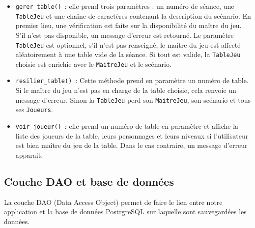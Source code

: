 \documentclass[11pt]{article}
\begin{document}
\begin{itemize}[label=, font=\small]
    \item \texttt{gerer\_table()}~: elle prend trois paramètres : un numéro de séance, une \texttt{TableJeu} et une chaîne de caractères contenant la description du scénario. En premier lieu, une vérification est faite sur la disponibilité du maître du jeu. S'il n'est pas disponible, un message d'erreur est retourné. Le paramètre \texttt{TableJeu} est optionnel, s'il n'est pas renseigné, le maître du jeu est affecté aléatoirement à une table vide de la séance. Si tout est valide, la \texttt{TableJeu} choisie est enrichie avec le \texttt{MaitreJeu} et le scénario.
    
    \item \texttt{resilier\_table()}~: Cette méthode prend en paramètre un numéro de table. Si le maître du jeu n'est pas en charge de la table choisie, cela renvoie un message d'erreur. Sinon la \texttt{TableJeu} perd son \texttt{MaitreJeu}, son scénario et tous ses \texttt{Joueurs}.
    
    \item \texttt{voir\_joueur()}~: elle prend un numéro de table en paramètre et affiche la liste des joueurs de la table, leurs personnages et leurs niveaux si l'utilisateur est bien maître du jeu de la table. Dans le cas contraire, un message d'erreur apparait.
\end{itemize}





\subsection{Couche DAO et base de données}

La couche DAO (Data Access Object) permet de faire le lien entre notre application et la base de données PostrgreSQL sur laquelle sont sauvegardées les données.





\newpage






\end{document}
